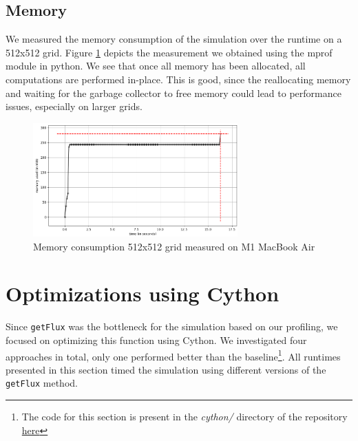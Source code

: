 \documentclass[a4paper,10pt]{article}
\begin{document}
\subsection{Memory}
We measured the memory consumption of the simulation over the runtime on a 512x512 grid.
Figure \ref{fig:memory_over_simulation} depicts the measurement we obtained using the mprof module in python.
We see that once all memory has been allocated, all computations are performed in-place.
This is good, since the reallocating memory and waiting for the garbage collector to free memory could lead to performance issues, especially on larger grids.
\begin{figure}[h]
  \centering
  \includegraphics[width=0.7\textwidth]{images/baseline/baseline_memory_512.png}
  \caption{Memory consumption 512x512 grid measured on M1 MacBook Air}
  \label{fig:memory_over_simulation}
\end{figure}

\section{Optimizations using Cython}
Since \verb|getFlux| was the bottleneck for the simulation based on our profiling, we focused on optimizing this function using Cython.
We investigated four approaches in total, only one performed better than the baseline\footnote{The code for this section is present in the \textit{cython/} directory of the repository \href{https://github.com/paulmyr/DD2358-HPC25/blob/master/10_project_rishi_paul/code/cython/finitevolume_cython_lib.pyx}{here}}.
All runtimes presented in this section timed the simulation using different versions of the \verb|getFlux| method.
\end{document}
